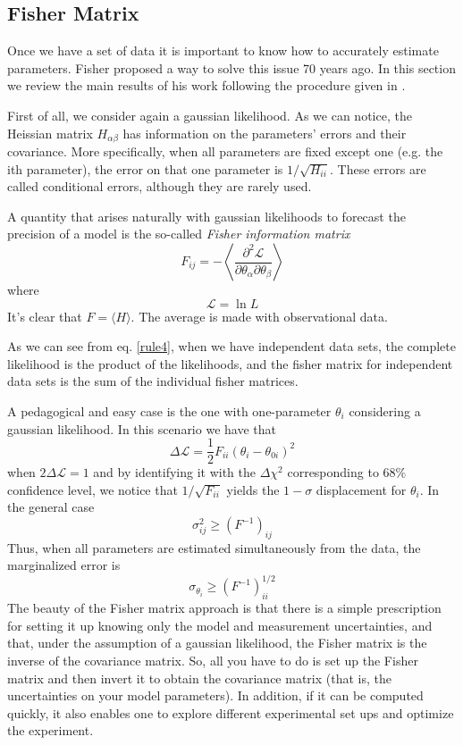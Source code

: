 \documentclass[onecolumn,           %
               showpacs,            %
               preprintnumbers,     %
               aps,                 %
               prl,          	    %
               letterpaper,             %
               superscriptaddress,      %
               nofootinbib,         %
               tightenlines,        %
               floats,floatfix      %
               ,usenatbib,
               ]{revtex4-1}
\begin{document}
\subsection{Fisher Matrix}

Once we have a set of data it is important to know how to accurately estimate parameters. Fisher \cite{Fisher} proposed a way to solve this issue 70 years ago. In this section we review the main results of his work following the procedure given in \cite{LiV}.

First of all, we consider again a gaussian likelihood. As we can notice, the Heissian matrix $H_{\alpha\beta}$ has information on the parameters' errors and their covariance. More specifically, when all parameters are fixed except one (e.g. the ith parameter), the error on that one parameter is $1/\sqrt{H_{ii}}$. These errors are called conditional errors, although they are rarely used.

A quantity that arises naturally with gaussian likelihoods to forecast the precision of a model is the so-called \textit{Fisher information matrix}
\begin{equation}
F_{ij}=-\left\langle \frac{\partial^2 \mathcal{L}}{\partial \theta_\alpha \partial \theta_\beta}\right\rangle
\end{equation}
where 
\begin{equation}
\mathcal{L}=\ln L
\end{equation}
It's clear that $F=\langle H\rangle$. The average is made with observational data. 

As we can see from eq. \eqref{rule4}, when we have independent data sets, the complete likelihood is the product of the likelihoods, and the fisher matrix for independent data sets is the sum of the individual fisher matrices. 

A pedagogical and easy case is the one with one-parameter $\theta_i$ considering a gaussian likelihood. In this scenario we have that
\begin{equation}
\Delta \mathcal{L}=\frac{1}{2}F_{ii}(\theta_i- \theta_{0i})^2
\end{equation}
when $2\Delta\mathcal{L}=1$ and by identifying it with the $\Delta \chi^2$ corresponding to $68\%$ confidence level, we notice that $1/\sqrt{F_{ii}}$ yields the $1-\sigma$ displacement for $\theta_i$. In the general case
\begin{equation}\label{rao}
\sigma_{ij}^2 \geq (F^{-1})_{ij}
\end{equation}
Thus, when all parameters are estimated simultaneously from the data, the marginalized error is
\begin{equation}
\sigma_{\theta_i}\geq (F^{-1})^{1/2}_{ii}
\end{equation}
The beauty of the Fisher matrix approach is that there is a simple prescription for setting it up knowing only the model and measurement uncertainties, and that, under the assumption of a gaussian likelihood, the Fisher matrix is the inverse of the covariance matrix. So, all you have to do is set up the Fisher matrix and then invert it to obtain the covariance matrix (that is, the uncertainties on your model parameters). In addition, if it can be computed quickly, it also enables one to explore different experimental set ups and optimize the experiment.
\end{document}
